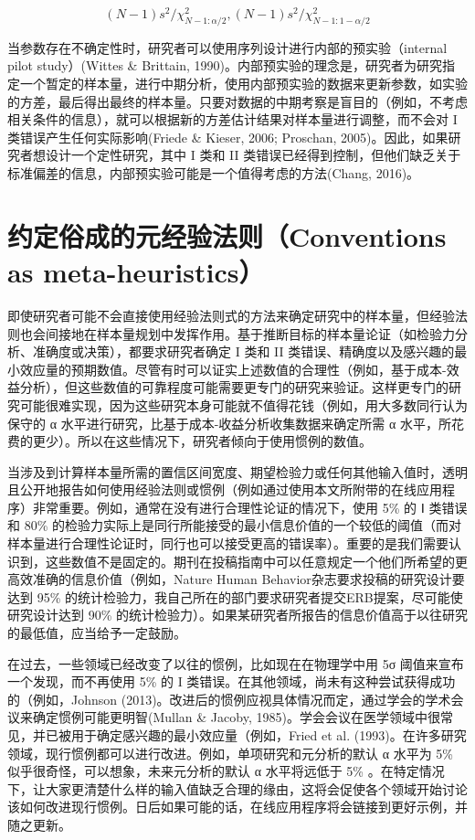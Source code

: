 \documentclass[
  letterpaper,
  DIV=11,
  numbers=noendperiod]{scrreprt}
\begin{document}
\[(N - 1)s^2/\chi^2_{N-1:\alpha/2},(N - 1)s^2/\chi^2_{N-1:1-\alpha/2}\]

当参数存在不确定性时，研究者可以使用序列设计进行内部的预实验（internal
pilot study）(Wittes \& Brittain,
1990)。内部预实验的理念是，研究者为研究指定一个暂定的样本量，进行中期分析，使用内部预实验的数据来更新参数，如实验的方差，最后得出最终的样本量。只要对数据的中期考察是盲目的（例如，不考虑相关条件的信息），就可以根据新的方差估计结果对样本量进行调整，而不会对
I 类错误产生任何实际影响(Friede \& Kieser, 2006; Proschan,
2005)。因此，如果研究者想设计一个定性研究，其中 I 类和 II
类错误已经得到控制，但他们缺乏关于标准偏差的信息，内部预实验可能是一个值得考虑的方法(Chang,
2016)。

\hypertarget{ux7ea6ux5b9aux4fd7ux6210ux7684ux5143ux7ecfux9a8cux6cd5ux5219conventions-as-meta-heuristics}{%
\section{约定俗成的元经验法则（Conventions as
meta-heuristics）}\label{ux7ea6ux5b9aux4fd7ux6210ux7684ux5143ux7ecfux9a8cux6cd5ux5219conventions-as-meta-heuristics}}

即使研究者可能不会直接使用经验法则式的方法来确定研究中的样本量，但经验法则也会间接地在样本量规划中发挥作用。基于推断目标的样本量论证（如检验力分析、准确度或决策），都要求研究者确定
I 类和 II
类错误、精确度以及感兴趣的最小效应量的预期数值。尽管有时可以证实上述数值的合理性（例如，基于成本-效益分析），但这些数值的可靠程度可能需要更专门的研究来验证。这样更专门的研究可能很难实现，因为这些研究本身可能就不值得花钱（例如，用大多数同行认为保守的
α 水平进行研究，比基于成本-收益分析收集数据来确定所需 α
水平，所花费的更少）。所以在这些情况下，研究者倾向于使用惯例的数值。

当涉及到计算样本量所需的置信区间宽度、期望检验力或任何其他输入值时，透明且公开地报告如何使用经验法则或惯例（例如通过使用本文所附带的在线应用程序）非常重要。例如，通常在没有进行合理性论证的情况下，使用
5\% 的 Ⅰ 类错误和 80\%
的检验力实际上是同行所能接受的最小信息价值的一个较低的阈值（而对样本量进行合理性论证时，同行也可以接受更高的错误率）。重要的是我们需要认识到，这些数值不是固定的。期刊在投稿指南中可以任意规定一个他们所希望的更高效准确的信息价值（例如，Nature
Human Behavior杂志要求投稿的研究设计要达到 95\%
的统计检验力，我自己所在的部门要求研究者提交ERB提案，尽可能使研究设计达到
90\%
的统计检验力）。如果某研究者所报告的信息价值高于以往研究的最低值，应当给予一定鼓励。

在过去，一些领域已经改变了以往的惯例，比如现在在物理学中用 5σ
阈值来宣布一个发现，而不再使用 5\% 的 I
类错误。在其他领域，尚未有这种尝试获得成功的（例如，Johnson
(2013)。改进后的惯例应视具体情况而定，通过学会的学术会议来确定惯例可能更明智(Mullan
\& Jacoby,
1985)。学会会议在医学领域中很常见，并已被用于确定感兴趣的最小效应量（例如，Fried
et al.
(1993)。在许多研究领域，现行惯例都可以进行改进。例如，单项研究和元分析的默认
α 水平为 5\% 似乎很奇怪，可以想象，未来元分析的默认 α 水平将远低于 5\%
。在特定情况下，让大家更清楚什么样的输入值缺乏合理的缘由，这将会促使各个领域开始讨论该如何改进现行惯例。日后如果可能的话，在线应用程序将会链接到更好示例，并随之更新。
\end{document}
